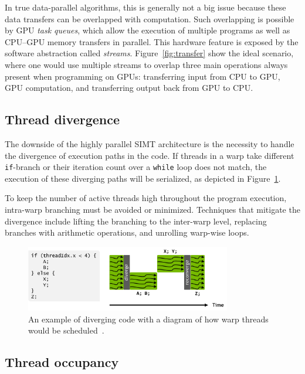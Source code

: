 In true data-parallel algorithms, this is generally not a big issue because these data transfers can be overlapped with computation. Such overlapping is possible by GPU \emph{task queues}, which allow the execution of multiple programs as well as CPU--GPU memory transfers in parallel. This hardware feature is exposed by the software abstraction called \emph{streams}. Figure~\ref{fig:transfer} show the ideal scenario, where one would use multiple streams to overlap three main operations always present when programming on GPUs: transferring input from CPU to GPU, GPU computation, and transferring output back from GPU to CPU.

\subsection{Thread divergence}
\label{sec:divergence}

The downside of the highly parallel SIMT architecture is the necessity to handle the divergence of execution paths in the code.
If threads in a warp take different \texttt{if}-branch or their iteration count over a \texttt{while} loop does not match, the execution of these diverging paths will be serialized, as depicted in Figure~\ref{fig:divergence}.

To keep the number of active threads high throughout the program execution, intra-warp branching must be avoided or minimized. Techniques that mitigate the divergence include lifting the branching to the inter-warp level, replacing branches with arithmetic operations, and unrolling warp-wise loops.

\begin{figure}
    \centering
    \includegraphics[width=0.8\textwidth]{img/divergence.png}
    \caption{An example of diverging code with a diagram of how warp threads would be scheduled~\cite{site:volta}.}
    \label{fig:divergence}
\end{figure}

\subsection{Thread occupancy}
\label{sec:occupancy}

